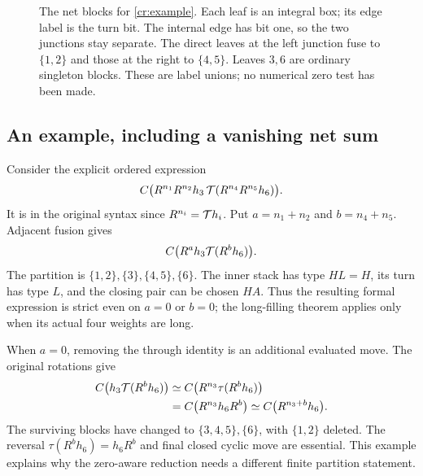 \begin{figure}[ht]
\centering
\caption{The net blocks for \eqref{cr:example}. Each leaf is an integral box; its edge label is the turn bit. The internal edge has bit one, so the two junctions stay separate. The direct leaves at the left junction fuse to $\{1,2\}$ and those at the right to $\{4,5\}$. Leaves $3,6$ are ordinary singleton blocks. These are label unions; no numerical zero test has been made.}\label{cr:net-figure}
\end{figure}

\subsection{An example, including a vanishing net sum}

Consider the explicit ordered expression
\begin{equation}\label{cr:example}
 C\bigl(R^{n_1}R^{n_2}h_3\,
                 \mathcal T(R^{n_4}R^{n_5}h_6)\bigr).
\end{equation}
It is in the original syntax since $R^{n_i}=\mathcal T h_i$. Put $a=n_1+n_2$ and $b=n_4+n_5$. Adjacent fusion gives
\[
                     C\bigl(R^a h_3\mathcal T(R^b h_6)\bigr).
\]
The partition is $\{1,2\},\{3\},\{4,5\},\{6\}$. The inner stack has type $HL=H$, its turn has type $L$, and the closing pair can be chosen $HA$. Thus the resulting formal expression is strict even on $a=0$ or $b=0$; the long-filling theorem applies only when its actual four weights are long.

When $a=0$, removing the through identity is an additional evaluated move. The original rotations give
\begin{align*}
 C\bigl(h_3\mathcal T(R^b h_6)\bigr)
 &\simeq C\bigl(R^{n_3}\tau(R^b h_6)\bigr)\\
 &=C\bigl(R^{n_3}h_6R^b\bigr)
 \simeq C\bigl(R^{n_3+b}h_6\bigr).
\end{align*}
The surviving blocks have changed to $\{3,4,5\},\{6\}$, with $\{1,2\}$ deleted. The reversal $\tau(R^b h_6)=h_6R^b$ and final closed cyclic move are essential. This example explains why the zero-aware reduction needs a different finite partition statement.
